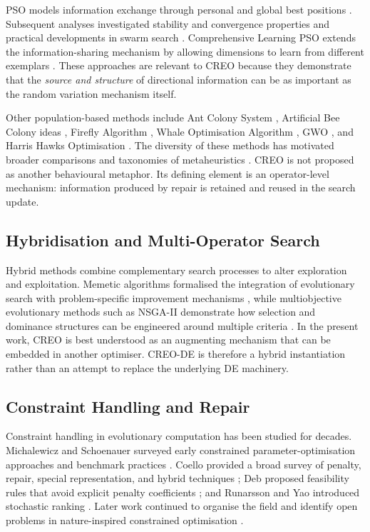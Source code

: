 \documentclass[a4paper,fleqn]{cas-sc}
\begin{document}
PSO models information exchange through personal and global best positions \cite{kennedy1995particle}. Subsequent analyses investigated stability and convergence properties \cite{clerc2002particle} and practical developments in swarm search \cite{eberhart2001pso}. Comprehensive Learning PSO extends the information-sharing mechanism by allowing dimensions to learn from different exemplars \cite{liang2006clpso}. These approaches are relevant to CREO because they demonstrate that the \emph{source and structure} of directional information can be as important as the random variation mechanism itself.

Other population-based methods include Ant Colony System \cite{dorigo1997acs}, Artificial Bee Colony ideas \cite{karaboga2005abc}, Firefly Algorithm \cite{yang2009firefly}, Whale Optimisation Algorithm \cite{mirjalili2016woa}, GWO \cite{mirjalili2014grey}, and Harris Hawks Optimisation \cite{heidari2019hho}. The diversity of these methods has motivated broader comparisons and taxonomies of metaheuristics \cite{blum2003metaheuristics}. CREO is not proposed as another behavioural metaphor. Its defining element is an operator-level mechanism: information produced by repair is retained and reused in the search update.

\subsection{Hybridisation and Multi-Operator Search}

Hybrid methods combine complementary search processes to alter exploration and exploitation. Memetic algorithms formalised the integration of evolutionary search with problem-specific improvement mechanisms \cite{moscato1989memetic}, while multiobjective evolutionary methods such as NSGA-II demonstrate how selection and dominance structures can be engineered around multiple criteria \cite{deb2002nsga2}. In the present work, CREO is best understood as an augmenting mechanism that can be embedded in another optimiser. CREO-DE is therefore a hybrid instantiation rather than an attempt to replace the underlying DE machinery.

\subsection{Constraint Handling and Repair}

Constraint handling in evolutionary computation has been studied for decades. Michalewicz and Schoenauer surveyed early constrained parameter-optimisation approaches and benchmark practices \cite{michalewicz1996constrained}. Coello provided a broad survey of penalty, repair, special representation, and hybrid techniques \cite{coello2002theoretical}; Deb proposed feasibility rules that avoid explicit penalty coefficients \cite{deb2000efficient}; and Runarsson and Yao introduced stochastic ranking \cite{runarsson2000stochastic}. Later work continued to organise the field and identify open problems in nature-inspired constrained optimisation \cite{mezura2011constraint}.
\end{document}
